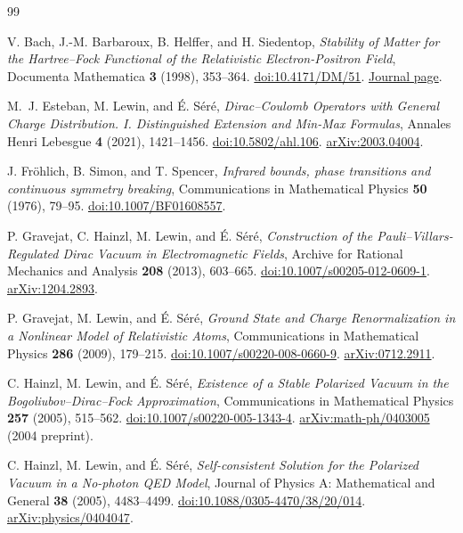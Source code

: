 {}
\begin{thebibliography}{99}
\raggedright

V. Bach, J.-M. Barbaroux, B. Helffer, and H. Siedentop,
\emph{Stability of Matter for the Hartree--Fock Functional of the Relativistic Electron-Positron Field},
Documenta Mathematica \textbf{3} (1998), 353--364.
\href{https://doi.org/10.4171/DM/51}{doi:10.4171/DM/51}.
\href{https://ems.press/journals/dm/articles/8964982}{Journal page}.

M.~J. Esteban, M. Lewin, and \'{E}. S\'er\'e,
\emph{Dirac--Coulomb Operators with General Charge Distribution. I. Distinguished Extension and Min-Max Formulas},
Annales Henri Lebesgue \textbf{4} (2021), 1421--1456.
\href{https://doi.org/10.5802/ahl.106}{doi:10.5802/ahl.106}.
\href{https://arxiv.org/abs/2003.04004}{arXiv:2003.04004}.

J. Fr\"ohlich, B. Simon, and T. Spencer,
\emph{Infrared bounds, phase transitions and continuous symmetry breaking},
Communications in Mathematical Physics \textbf{50} (1976), 79--95.
\href{https://doi.org/10.1007/BF01608557}{doi:10.1007/BF01608557}.

P. Gravejat, C. Hainzl, M. Lewin, and \'E. S\'er\'e,
\emph{Construction of the Pauli--Villars-Regulated Dirac Vacuum in Electromagnetic Fields},
Archive for Rational Mechanics and Analysis \textbf{208} (2013), 603--665.
\href{https://doi.org/10.1007/s00205-012-0609-1}{doi:10.1007/s00205-012-0609-1}.
\href{https://arxiv.org/abs/1204.2893}{arXiv:1204.2893}.

P. Gravejat, M. Lewin, and \'{E}. S\'er\'e,
\emph{Ground State and Charge Renormalization in a Nonlinear Model of Relativistic Atoms},
Communications in Mathematical Physics \textbf{286} (2009), 179--215.
\href{https://doi.org/10.1007/s00220-008-0660-9}{doi:10.1007/s00220-008-0660-9}.
\href{https://arxiv.org/abs/0712.2911}{arXiv:0712.2911}.

C. Hainzl, M. Lewin, and \'{E}. S\'er\'e,
\emph{Existence of a Stable Polarized Vacuum in the Bogoliubov--Dirac--Fock Approximation},
Communications in Mathematical Physics \textbf{257} (2005), 515--562.
\href{https://doi.org/10.1007/s00220-005-1343-4}{doi:10.1007/s00220-005-1343-4}.
\href{https://arxiv.org/abs/math-ph/0403005}{arXiv:math-ph/0403005}
(2004 preprint).

C. Hainzl, M. Lewin, and \'{E}. S\'er\'e,
\emph{Self-consistent Solution for the Polarized Vacuum in a No-photon QED Model},
Journal of Physics A: Mathematical and General \textbf{38} (2005), 4483--4499.
\href{https://doi.org/10.1088/0305-4470/38/20/014}{doi:10.1088/0305-4470/38/20/014}.
\href{https://arxiv.org/abs/physics/0404047}{arXiv:physics/0404047}.


\end{thebibliography}
